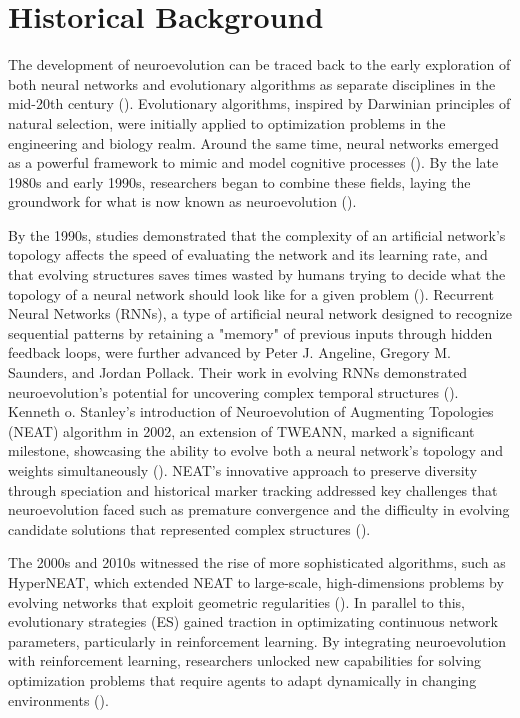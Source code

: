 \section{Historical Background}\label{sec:ne_historical_background}
The development of neuroevolution can be traced back to the early exploration of both neural networks and evolutionary algorithms as separate disciplines in the mid-20th century (\cite{stanley2002evolving}). Evolutionary algorithms, inspired by Darwinian principles of natural selection, were initially applied to optimization problems in the engineering and biology realm. Around the same time, neural networks emerged as a powerful framework to mimic and model cognitive processes (\cite{stanley2002evolving}). By the late 1980s and early 1990s, researchers began to combine these fields, laying the groundwork for what is now known as neuroevolution (\cite{stanley2002evolving}). \bigskip

\noindent By the 1990s, studies demonstrated that the complexity of an artificial network's topology affects the speed of evaluating the network and its learning rate, and that evolving structures saves times wasted by humans trying to decide what the topology of a neural network should look like for a given problem (\cite{stanley2002evolving}). Recurrent Neural Networks (RNNs), a type of artificial neural network designed to recognize sequential patterns by retaining a "memory" of previous inputs through hidden feedback loops, were further advanced by Peter J. Angeline, Gregory M. Saunders, and Jordan Pollack. Their work in evolving RNNs demonstrated neuroevolution's potential for uncovering complex temporal structures (\cite{angeline1994evolutionary}). Kenneth o. Stanley's introduction of Neuroevolution of Augmenting Topologies (NEAT) algorithm in 2002, an extension of TWEANN, marked a significant milestone, showcasing the ability to evolve both a neural network's topology and weights simultaneously (\cite{stanley2002evolving}). NEAT's innovative approach to preserve diversity through speciation and historical marker tracking addressed key challenges that neuroevolution faced such as premature convergence and the difficulty in evolving candidate solutions that represented complex structures (\cite{stanley2002evolving}). \bigskip

\noindent The 2000s and 2010s witnessed the rise of more sophisticated algorithms, such as HyperNEAT, which extended NEAT to large-scale, high-dimensions problems by evolving networks that exploit geometric regularities (\cite{stanley2009hypercube}). In parallel to this, evolutionary strategies (ES) gained traction in optimizating continuous network parameters, particularly in reinforcement learning. By integrating neuroevolution with reinforcement learning, researchers unlocked new capabilities for solving optimization problems that require agents to adapt dynamically in changing environments (\cite{igel2003neuroevolution}). \bigskip

